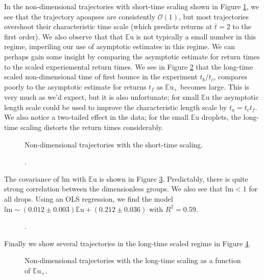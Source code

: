 \documentclass[10pt,a4paper]{article}
\begin{document}
In the non-dimensional trajectories with short-time scaling shown in Figure \ref{fig:series_s_ds}, we see that the trajectory apoapses are consistently $\mathcal{O}(1)$, but most trajectories overshoot their characteristic time scale (which predicts returns at $\bar{t}  =2$ to the first order). We also observe that that $\mathbb{E}\mbox{u}$ is not typically a small number in this regime, imperiling our use of asymptotic estimates in this regime. We can perhaps gain some insight by comparing the asymptotic estimate for return times to the scaled experiemental return times. We see in Figure \ref{fig:times} that the long-time scaled non-dimensional time of first bounce in the experiment $t_b / t_c$, compares poorly to the asymptotic estimate for returns $t_f$ as $\mathbb{E}\mbox{u}_+$ becomes large. This is very much as we'd expect, but it is also unfortunate; for small $\mathbb{E}\mbox{u}$ the asymptotic length scale could be used to improve the characteristic length scale by $t_a = t_c t_f$. We also notice a two-tailed effect in the data; for the small $\mathbb{E}\mbox{u}$ droplets, the long-time scaling distorts the return times considerably.   
\begin{figure}[htb]
    \centering
    
    \caption{Non-dimensional trajectories with the short-time scaling.\label{fig:series_s_ds}}
\end{figure}

\begin{figure}[htb]
    \centering
    
    \caption{.\label{fig:times}}
\end{figure}

The covariance of $\mathbb{I}\mbox{m}$ with $\mathbb{E}\mbox{u}$ is shown in Figure \ref{fig:dnumbs}. Predictably, there is quite strong correlation between the dimensionless groups. We also see that $\mathbb{I}\mbox{m} < 1$ for all drops. Using an OLS regression, we find the model $\mathbb{I}\mbox{m} \sim (0.012 \pm 0.003) \mathbb{E}\mbox{u} + (0.212 \pm 0.036) $ with $R^2 =0.59$.
\begin{figure}[htb]
    \centering
    
    \caption{.\label{fig:dnumbs}}
\end{figure}

Finally we show several trajectories in the long-time scaled regime in Figure \ref{fig:series_l_ds}.
\begin{figure}[htb]
    \centering
    
    \caption{Non-dimensional trajectories with the long-time scaling as a function of ${\mathbb{E}\mbox{u}}_+$.\label{fig:series_l_ds}}
\end{figure}
\end{document}
